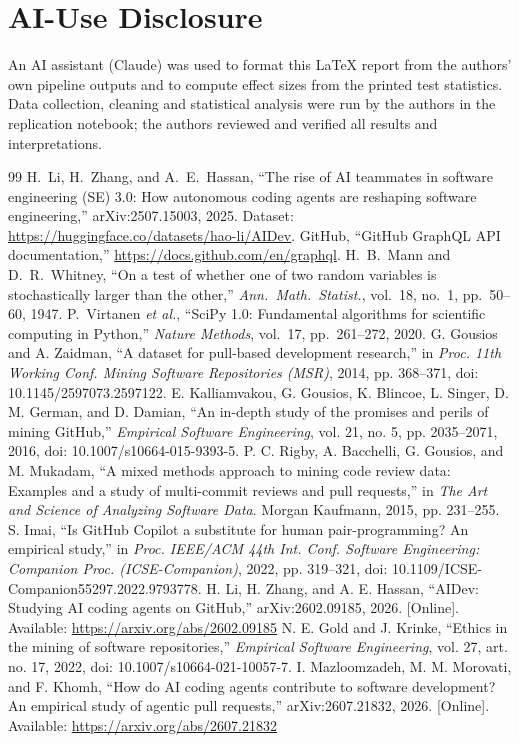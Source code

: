 \documentclass[conference]{IEEEtran}
\begin{document}
\section*{AI-Use Disclosure}
An AI assistant (Claude) was used to format this LaTeX report from the authors' own pipeline outputs and to compute effect sizes from the printed test statistics. Data collection, cleaning and statistical analysis were run by the authors in the replication notebook; the authors reviewed and verified all results and interpretations.

\begin{thebibliography}{99}
 H.~Li, H.~Zhang, and A.~E.~Hassan, ``The rise of AI teammates in software engineering (SE) 3.0: How autonomous coding agents are reshaping software engineering,'' arXiv:2507.15003, 2025. Dataset: \url{https://huggingface.co/datasets/hao-li/AIDev}.
 GitHub, ``GitHub GraphQL API documentation,'' \url{https://docs.github.com/en/graphql}.
 H.~B.~Mann and D.~R.~Whitney, ``On a test of whether one of two random variables is stochastically larger than the other,'' \emph{Ann.\ Math.\ Statist.}, vol.~18, no.~1, pp.~50--60, 1947.
 P.~Virtanen \emph{et al.}, ``SciPy 1.0: Fundamental algorithms for scientific computing in Python,'' \emph{Nature Methods}, vol.~17, pp.~261--272, 2020.
G. Gousios and A. Zaidman, ``A dataset for pull-based development research,'' in \emph{Proc. 11th Working Conf. Mining Software Repositories (MSR)}, 2014, pp. 368--371, doi: 10.1145/2597073.2597122.
E. Kalliamvakou, G. Gousios, K. Blincoe, L. Singer, D. M. German, and D. Damian, ``An in-depth study of the promises and perils of mining GitHub,'' \emph{Empirical Software Engineering}, vol. 21, no. 5, pp. 2035--2071, 2016, doi: 10.1007/s10664-015-9393-5.
P. C. Rigby, A. Bacchelli, G. Gousios, and M. Mukadam, ``A mixed methods approach to mining code review data: Examples and a study of multi-commit reviews and pull requests,'' in \emph{The Art and Science of Analyzing Software Data}. Morgan Kaufmann, 2015, pp. 231--255.
S. Imai, ``Is GitHub Copilot a substitute for human pair-programming? An empirical study,'' in \emph{Proc. IEEE/ACM 44th Int. Conf. Software Engineering: Companion Proc. (ICSE-Companion)}, 2022, pp. 319--321, doi: 10.1109/ICSE-Companion55297.2022.9793778.
H. Li, H. Zhang, and A. E. Hassan, ``AIDev: Studying AI coding agents on GitHub,'' arXiv:2602.09185, 2026. [Online]. Available: \url{https://arxiv.org/abs/2602.09185}
N. E. Gold and J. Krinke, ``Ethics in the mining of software repositories,'' \emph{Empirical Software Engineering}, vol. 27, art. no. 17, 2022, doi: 10.1007/s10664-021-10057-7.
I. Mazloomzadeh, M. M. Morovati, and F. Khomh, ``How do AI coding agents contribute to software development? An empirical study of agentic pull requests,'' arXiv:2607.21832, 2026. [Online]. Available: \url{https://arxiv.org/abs/2607.21832}
\end{thebibliography}
\end{document}
